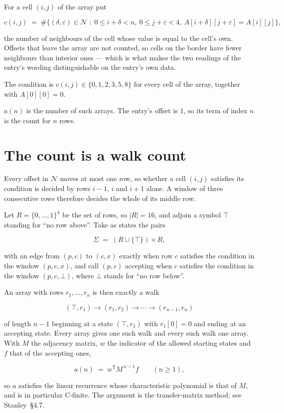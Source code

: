 \documentclass[11pt]{article}
\theoremstyle{definition}
\begin{document}
For a cell $(i,j)$ of the array put

\[c(i,j) \;=\; \#\bigl\{(\delta,\varepsilon)\in\mathcal{N} \;:\; 0\le i+\delta<n,\ 0\le j+\varepsilon<4,\ A[i+\delta][j+\varepsilon] = A[i][j]\bigr\},\]

the number of neighbours of the cell whose value is equal to the cell's own. Offsets that leave the array are not counted, so cells on the border have fewer neighbours than interior ones --- which is what makes the two readings of the entry's wording distinguishable on the entry's own data.

The condition is $c(i,j) \in \{0, 1, 2, 3, 5, 8\}$ for every cell of the array, together with $A[0][0]=0$.

$a(n)$ is the number of such arrays. The entry's offset is 1, so its term of index $n$ is the count for $n$ rows.

\section{The count is a walk count}

Every offset in $\mathcal{N}$ moves at most one row, so whether a cell $(i,j)$ satisfies its condition is decided by rows $i-1$, $i$ and $i+1$ alone. A window of three consecutive rows therefore decides the whole of its middle row.

Let $R = \{0,\dots,1\}^{4}$ be the set of rows, so $|R| = 16$, and adjoin a symbol $\top$ standing for ``no row above''. Take as states the pairs

\[\Sigma \;=\; (R \cup \{\top\}) \times R,\]

with an edge from $(p,c)$ to $(c,x)$ exactly when row $c$ satisfies the condition in the window $(p,c,x)$, and call $(p,c)$ accepting when $c$ satisfies the condition in the window $(p,c,\bot)$, where $\bot$ stands for ``no row below''.

An array with rows $r_1,\dots,r_n$ is then exactly a walk

\[(\top,r_1) \to (r_1,r_2) \to \cdots \to (r_{n-1},r_n)\]

of length $n-1$ beginning at a state $(\top,r_1)$ with $r_1[0]=0$ and ending at an accepting state. Every array gives one such walk and every such walk one array. With $M$ the adjacency matrix, $w$ the indicator of the allowed starting states and $f$ that of the accepting ones,

\[a(n) \;=\; w^{\mathsf T} M^{\,n-1} f \qquad (n \ge 1),\]

so $a$ satisfies the linear recurrence whose characteristic polynomial is that of $M$, and is in particular C-finite. The argument is the transfer-matrix method; see Stanley~\S4.7.
\end{document}
